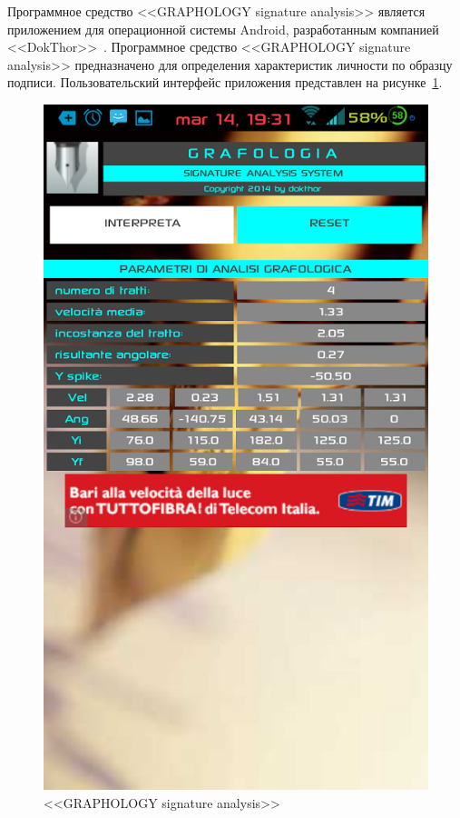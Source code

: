 Программное средство <<GRAPHOLOGY signature analysis>> является приложением для операционной системы Android, разработанным компанией <<DokThor>>~\cite{analogs_graphology_sign_analysis}. Программное средство <<GRAPHOLOGY signature analysis>> предназначено для определения характеристик личности по образцу подписи. Пользовательский интерфейс приложения представлен на рисунке~\ref{fig:domain:analog:graphology_sign_analysis}.

\begin{figure}[h]
    \centering
    \includegraphics[height=0.5\textheight]{figures/analog_graphology_sign_analysis.png}
    \caption{<<GRAPHOLOGY signature analysis>>}
    \label{fig:domain:analog:graphology_sign_analysis}
\end{figure}

